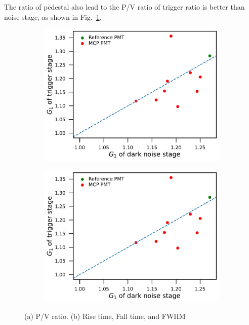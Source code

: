 The ratio of pedestal also lead to the P/V ratio of trigger ratio is better than noise stage, as shown in Fig.~\ref{fig:PVCompare}.
\begin{figure}[!htbp]
    \centering
    \begin{subfigure}[b]{0.49\textwidth}
        \includegraphics[width=\textwidth,page=6]{figures/result/compare.pdf}
        \caption{}
        \label{fig:PVCompare}
    \end{subfigure}
    \begin{subfigure}[b]{0.49\textwidth}
        \includegraphics[width=\textwidth,page=7]{figures/result/compare.pdf}
        \caption{}
        \label{fig:RiseCompare}
    \end{subfigure}
    \caption{(a) P/V ratio. (b) Rise time, Fall time, and FWHM}
\end{figure}

